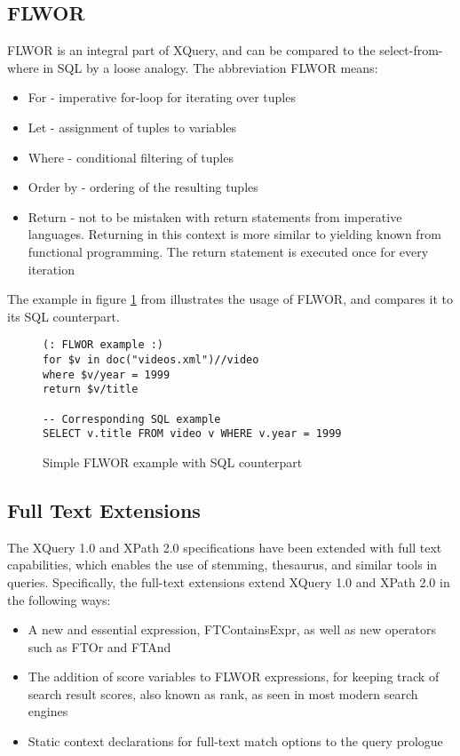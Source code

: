 \subsection{FLWOR}
FLWOR is an integral part of XQuery, and can be compared to the
select-from-where in SQL by a loose analogy. The abbreviation FLWOR means:
\begin{itemize}
\item For - imperative for-loop for iterating over tuples
\item Let - assignment of tuples to variables
\item Where - conditional filtering of tuples
\item Order by - ordering of the resulting tuples
\item Return - not to be mistaken with return statements from imperative
languages. Returning in this context is more similar to yielding known from
functional programming. The return statement is executed once for every
iteration   
\end{itemize}
The example in figure \ref{code:theory:flwor} from \cite{styl00} illustrates
the usage of FLWOR, and  compares it to its SQL counterpart.
\begin{figure}
\begin{Verbatim}
(: FLWOR example :)
for $v in doc("videos.xml")//video
where $v/year = 1999
return $v/title

-- Corresponding SQL example 
SELECT v.title FROM video v WHERE v.year = 1999
\end{Verbatim}
\caption[Simple FLWOR example]{Simple FLWOR example with SQL counterpart}
\label{code:theory:flwor}
\end{figure}

\subsection{Full Text Extensions}
The XQuery 1.0  and XPath 2.0 specifications have been extended with full text
capabilities\cite{w3c02}, which enables the use of stemming, thesaurus,
and similar tools in queries. Specifically, the full-text extensions
extend XQuery 1.0 and XPath 2.0 in the following ways:
\begin{itemize}
\item A new and essential expression, FTContainsExpr, as well as new operators
such as FTOr and FTAnd 
\item The addition of score variables to FLWOR expressions, for keeping track
of search result scores, also known as rank, as seen in most modern search
engines 
\item Static context declarations for full-text match options to the query
prologue 
\end{itemize}

